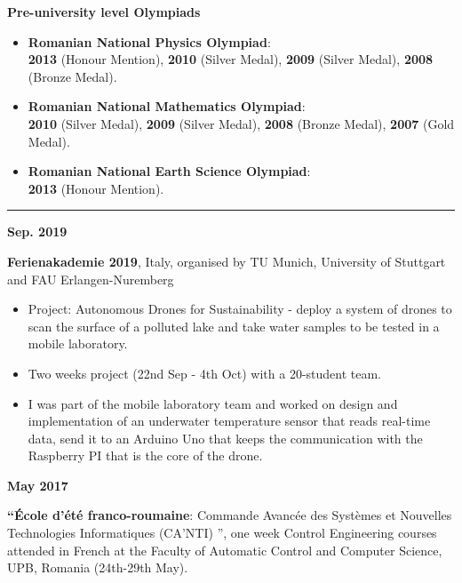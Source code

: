 \documentclass[a4paper,10pt]{article}
\newlength{\cvcolumngapwidth}
\newlength{\cvleftcolumnwidth}
\newlength{\cvrightcolumnwidth}
\newcommand{\cvsectionstyle}[1]{{\large\cvsectionfont\textcolor{cvsectioncolor}{#1}}}
\newcommand{\cvdurationstyle}[1]{{\cvdurationfont\textcolor{cvdurationcolor}{#1}}}
\newcommand{\cvheadingstyle}[1]{{\cvheadingfont\textcolor{cvheadingcolor}{#1}}}
\newlength{\cvafteritemskipamount}
\newlength{\cvaftersectionskipamount}
\newlength{\cvbetweensectionandheadingextraskipamount}
\newlength{\cvparskip}
\newcommand{\cvsection}[1]{
    \begin{minipage}[t]{\cvleftcolumnwidth}
        \raggedleft\cvsectionstyle{#1}
    \end{minipage}%
    \hspace{\cvcolumngapwidth}%
    \begin{minipage}[t]{\cvrightcolumnwidth}
        \textcolor{cvrulecolor}{\rule{\cvrightcolumnwidth}{0.3mm}}
    \end{minipage}

    \vspace{\cvaftersectionskipamount}
}
\newcommand{\cvitem}[2]{
    \begin{minipage}[t]{\cvleftcolumnwidth}
        \raggedleft #1
    \end{minipage}%
    \hspace{\cvcolumngapwidth}%
    \begin{minipage}[t]{\cvrightcolumnwidth}
        \setlength{\parskip}{\cvparskip} #2
    \end{minipage}

    \vspace{\cvafteritemskipamount}
}
\begin{document}
\cvitem{
    \cvheadingstyle{\textbf{Pre-university level Olympiads}}
}{
    \begin{itemize}[leftmargin=*]
        \item \textbf{Romanian National Physics Olympiad}: \\
              \textbf{2013} (Honour Mention), \textbf{2010} (Silver Medal), \textbf{2009} (Silver Medal), \textbf{2008} (Bronze Medal).
        \item \textbf{Romanian National Mathematics Olympiad}: \\
              \textbf{2010} (Silver Medal), \textbf{2009} (Silver Medal), \textbf{2008} (Bronze Medal), \textbf{2007} (Gold Medal).

        \item \textbf{Romanian National Earth Science Olympiad}: \\
              \textbf{2013} (Honour Mention).
    \end{itemize}


}

\cvsection{Summer Schools (study and training)}

\vspace{\cvbetweensectionandheadingextraskipamount}



\cvitem{
    \cvdurationstyle{\textbf{Sep. 2019}}
}{
    \textbf{Ferienakademie 2019}, Italy, organised by TU Munich, University of Stuttgart and FAU Erlangen-Nuremberg
    \begin{itemize}[leftmargin=*]
        \item Project: Autonomous Drones for Sustainability - deploy a system of drones to scan the surface of a polluted lake and take water samples to be tested in a mobile laboratory.
        \item Two weeks project (22nd Sep - 4th Oct) with a 20-student team.
        \item I was part of the mobile laboratory team and worked on design and implementation of an underwater temperature sensor that reads real-time data, send it to an Arduino Uno that keeps the communication with the Raspberry PI that is the core of the drone.
    \end{itemize}

}
\cvitem{
    \cvdurationstyle{\textbf{May 2017}}
}{  \textbf{``\'Ecole d’\'et\'e franco-roumaine}: Commande Avanc\'ee des Systèmes et Nouvelles Technologies
    Informatiques (CA'NTI) '', one week Control Engineering courses attended in French at the Faculty of Automatic Control and Computer Science, UPB, Romania (24th-29th May).

}
\end{document}

